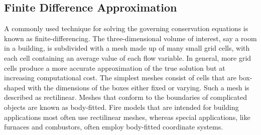 \documentclass[graybox]{svmult}
\begin{document}
\subsection{Finite Difference Approximation}

\label{fin_diff}

A commonly used technique for solving the governing conservation equations is known as finite-differencing. The three-dimensional volume of interest, say a room in a building, is subdivided with a mesh made up of many small grid cells, with each cell containing an average value of each flow variable. In general, more grid cells produce a more accurate approximation of the true solution but at increasing computational cost. The simplest meshes consist of cells that are box-shaped with the dimensions of the boxes either fixed or varying. Such a mesh is described as rectilinear. Meshes that conform to the boundaries of complicated objects are known as body-fitted. Fire models that are intended for building applications most often use rectilinear meshes, whereas special applications, like furnaces and combustors, often employ body-fitted coordinate systems.
\end{document}
